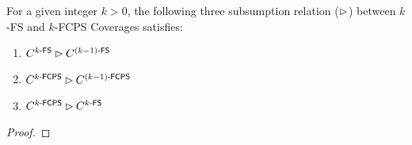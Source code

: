 \begin{theorem}\label{thm:subs}
  For a given integer $k > 0$, the following three subsumption relation
  ($\rhd$) between $k$-FS and $k$-FCPS Coverages satisfies:
  \begin{enumerate}
    \item $C_{}^{{k}\textsf{-FS}} \rhd C_{}^{{(k-1)}\textsf{-FS}}$
    \item $C_{}^{{k}\textsf{-FCPS}} \rhd C_{}^{{(k-1)}\textsf{-FCPS}}$
    \item $C_{}^{{k}\textsf{-FCPS}} \rhd C_{}^{{k}\textsf{-FS}}$
  \end{enumerate}
\end{theorem}

\begin{proof}
  \todo
\end{proof}
